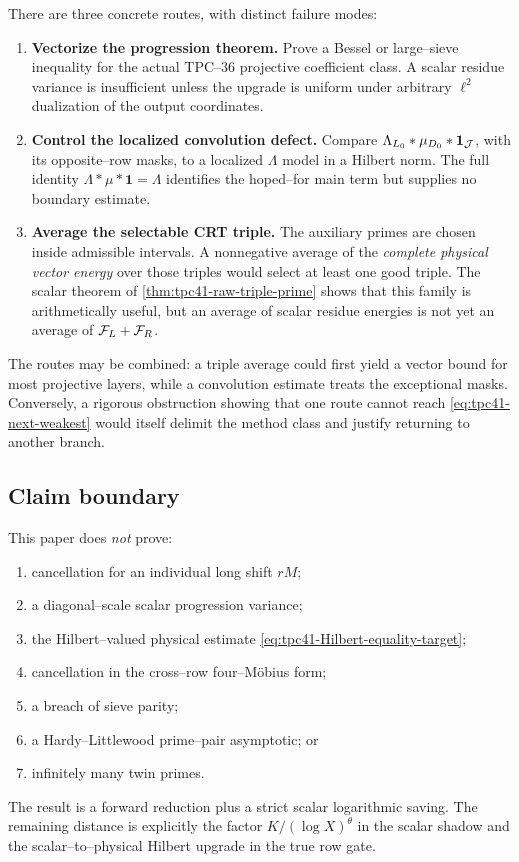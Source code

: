 There are three concrete routes, with distinct failure modes:
\begin{enumerate}[label=(\alph*)]
 \item \textbf{Vectorize the progression theorem.}  Prove a Bessel or
 large--sieve inequality for the actual TPC--36 projective coefficient
 class.  A scalar residue variance is insufficient unless the upgrade is
 uniform under arbitrary \(\ell^2\) dualization of the output coordinates.
 \item \textbf{Control the localized convolution defect.}  Compare
 \(\Lambda_{L_0}*\mu_{D_0}*\mathbf1_{\mathcal J}\), with its opposite--row masks,
 to a localized \(\Lambda\) model in a Hilbert norm.  The full identity
 \(\Lambda*\mu*\mathbf1=\Lambda\) identifies the hoped--for main term but
 supplies no boundary estimate.
 \item \textbf{Average the selectable CRT triple.}  The auxiliary primes
 are chosen inside admissible intervals.  A nonnegative average of the
 \emph{complete physical vector energy} over those triples would select
 at least one good triple.  The scalar theorem of
 \cref{thm:tpc41-raw-triple-prime} shows that this family is arithmetically
 useful, but an average of scalar residue energies is not yet an average
 of \(\mathcal F_L+\mathcal F_R\).
\end{enumerate}

The routes may be combined: a triple average could first yield a vector
bound for most projective layers, while a convolution estimate treats the
exceptional masks.  Conversely, a rigorous obstruction showing that one
route cannot reach \eqref{eq:tpc41-next-weakest} would itself delimit the
method class and justify returning to another branch.

\subsection{Claim boundary}

This paper does \emph{not} prove:
\begin{enumerate}[label=(\roman*)]
 \item cancellation for an individual long shift \(rM\);
 \item a diagonal--scale scalar progression variance;
 \item the Hilbert--valued physical estimate
 \eqref{eq:tpc41-Hilbert-equality-target};
 \item cancellation in the cross--row four--M\"obius form;
 \item a breach of sieve parity;
 \item a Hardy--Littlewood prime--pair asymptotic; or
 \item infinitely many twin primes.
\end{enumerate}
The result is a forward reduction plus a strict scalar logarithmic saving.
The remaining distance is explicitly the factor
\(K/(\log X)^\theta\) in the scalar shadow and the scalar--to--physical
Hilbert upgrade in the true row gate.
